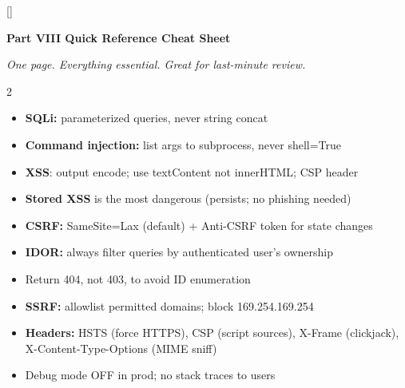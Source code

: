 \documentclass[11pt, letterpaper]{article}
\newcommand{\purplesections}{%
  \titleformat{\section}{\large\bfseries\color{sectionpurple}}{}{0em}{}[\color{sectionpurple}\titlerule]%
  \titleformat{\subsection}{\normalsize\bfseries\color{sectionpurple!80!black}}{}{0em}{}%
}
\newcommand{\partbanner}[3]{%
  \begin{tcolorbox}[colback=#1, colframe=#2, boxrule=1.2pt, arc=4pt,
    left=8pt, right=8pt, top=6pt, bottom=6pt]
    \begin{center}{\LARGE\bfseries #3}\end{center}
  \end{tcolorbox}%
}
\begin{document}
\newpage

\purplesections
{}
\partbanner{part3bg}{sectionpurple}{Part VIII \quad Quick Reference Cheat Sheet}

\vspace{4pt}
\begin{center}\small\itshape One page. Everything essential. Great for last-minute review.\end{center}
\vspace{4pt}

\begin{tcolorbox}[colback=part6bg, colframe=sectionred,
  title={\bfseries Web Application Security (OWASP)}, arc=3pt, boxrule=1pt]
\footnotesize
\begin{multicols}{2}
\begin{itemize}[noitemsep, leftmargin=*]
  \item \textbf{SQLi:} parameterized queries, never string concat
  \item \textbf{Command injection:} list args to subprocess, never shell=True
  \item \textbf{XSS}: output encode; use textContent not innerHTML; CSP header
  \item \textbf{Stored XSS} is the most dangerous (persists; no phishing needed)
  \item \textbf{CSRF:} SameSite=Lax (default) + Anti-CSRF token for state changes
\end{itemize}
\columnbreak
\begin{itemize}[noitemsep, leftmargin=*]
  \item \textbf{IDOR:} always filter queries by authenticated user's ownership
  \item Return 404, not 403, to avoid ID enumeration
  \item \textbf{SSRF:} allowlist permitted domains; block 169.254.169.254
  \item \textbf{Headers:} HSTS (force HTTPS), CSP (script sources), X-Frame (clickjack), X-Content-Type-Options (MIME sniff)
  \item Debug mode OFF in prod; no stack traces to users
\end{itemize}
\end{multicols}
\end{tcolorbox}
\end{document}

